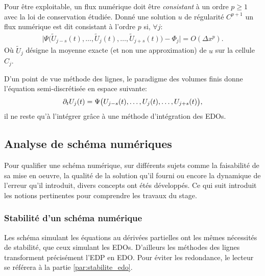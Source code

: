     \begin{definition}
        Pour être exploitable, un flux numérique doit être \textit{consistant} à un ordre $p\geq 1$ avec la loi de conservation étudiée.
        Donné une solution $u$ de régularité $C^{p+1}$ un flux numérique est dit consistant à l'ordre $p$ si, $\forall j$:
        \begin{align}
            \vert \Psi \bigl( \tilde U_{j-s}(t) , \ldots ,\tilde  U_j(t), \ldots ,  \tilde U_{j+s}(t)\bigr) -  \Phi_j \vert = O(\Delta x^p).
        \end{align}
        Où $\tilde U_j$ désigne la moyenne exacte (et non une approximation) de $u$ sur la cellule $C_j$.
    \end{definition}
    D'un point de vue méthode des lignes, le paradigme des volumes finis donne l'équation semi-discrétisée en espace suivante:
    \begin{align}
        \partial_t U_j(t) = \Psi \bigl( U_{j-s}(t) , \ldots , U_j(t), \ldots ,  U_{j+s}(t)\bigr),
    \end{align}
    il ne reste qu'à l'intégrer grâce à une méthode d'intégration des EDOs.


\subsection{Analyse de schéma numériques}
    Pour qualifier une schéma numérique, sur différents sujets comme 
    la faisabilité de sa mise en oeuvre, la qualité de la solution qu'il fourni ou encore la dynamique de l'erreur qu'il introduit, 
    divers concepts ont étés développés. Ce qui suit introduit les notions pertinentes pour comprendre les travaux du stage. 

    \subsubsection{Stabilité d'un schéma numérique}
        Les schéma simulant les équations au dérivées partielles ont les mêmes nécessités de stabilité, que ceux simulant les EDOs. 
        D'ailleurs les méthodes des lignes transforment précisément l'EDP en EDO. 
        Pour éviter les redondance, le lecteur se référera à la partie \ref{par:stabilite_edo}.
